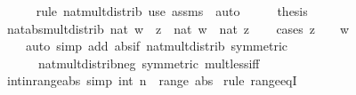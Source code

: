 \begin{isabellebody}
\ \ \ \ \isamarkupfalse%
\ {\isacharparenleft}{\kern0pt}rule\ nat{\isacharunderscore}{\kern0pt}mult{\isacharunderscore}{\kern0pt}distrib{\isacharparenright}{\kern0pt}\ {\isacharparenleft}{\kern0pt}use\ assms\ \ auto{\isacharparenright}{\kern0pt}\isanewline
\ \ \isamarkupfalse%
\ \isamarkupfalse%
\ {\isacharquery}{\kern0pt}thesis\ \isacommand{{\isachardot}{\kern0pt}}\isamarkupfalse%
\isanewline
{}\isamarkupfalse%
%
\endisatagproof
{\isafoldproof}%
%
\isadelimproof
\isanewline
%
\endisadelimproof
\isanewline
{}\isamarkupfalse%
\ nat{\isacharunderscore}{\kern0pt}abs{\isacharunderscore}{\kern0pt}mult{\isacharunderscore}{\kern0pt}distrib{\isacharcolon}{\kern0pt}\ {\isachardoublequoteopen}nat\ {\isasymbar}w\ {\isacharasterisk}{\kern0pt}\ z{\isasymbar}\ {\isacharequal}{\kern0pt}\ nat\ {\isasymbar}w{\isasymbar}\ {\isacharasterisk}{\kern0pt}\ nat\ {\isasymbar}z{\isasymbar}{\isachardoublequoteclose}\isanewline
%
\isadelimproof
\ \ %
\endisadelimproof
%
\isatagproof
{}\isamarkupfalse%
\ {\isacharparenleft}{\kern0pt}cases\ {\isachardoublequoteopen}z\ {\isacharequal}{\kern0pt}\ {}\ {\isasymor}\ w\ {\isacharequal}{\kern0pt}\ {}{\isachardoublequoteclose}{\isacharparenright}{\kern0pt}\isanewline
\ \ \ \ {\isacharparenleft}{\kern0pt}auto\ simp\ add{\isacharcolon}{\kern0pt}\ abs{\isacharunderscore}{\kern0pt}if\ nat{\isacharunderscore}{\kern0pt}mult{\isacharunderscore}{\kern0pt}distrib\ {\isacharbrackleft}{\kern0pt}symmetric{\isacharbrackright}{\kern0pt}\isanewline
\ \ \ \ \ \ nat{\isacharunderscore}{\kern0pt}mult{\isacharunderscore}{\kern0pt}distrib{\isacharunderscore}{\kern0pt}neg\ {\isacharbrackleft}{\kern0pt}symmetric{\isacharbrackright}{\kern0pt}\ mult{\isacharunderscore}{\kern0pt}less{\isacharunderscore}{\kern0pt}{}{\isacharunderscore}{\kern0pt}iff{\isacharparenright}{\kern0pt}%
\endisatagproof
{\isafoldproof}%
%
\isadelimproof
\isanewline
%
\endisadelimproof
\isanewline
{}\isamarkupfalse%
\ int{\isacharunderscore}{\kern0pt}in{\isacharunderscore}{\kern0pt}range{\isacharunderscore}{\kern0pt}abs\ {\isacharbrackleft}{\kern0pt}simp{\isacharbrackright}{\kern0pt}{\isacharcolon}{\kern0pt}\ {\isachardoublequoteopen}int\ n\ {\isasymin}\ range\ abs{\isachardoublequoteclose}\isanewline
%
\isadelimproof
%
\endisadelimproof
%
\isatagproof
{}\isamarkupfalse%
\ {\isacharparenleft}{\kern0pt}rule\ range{\isacharunderscore}{\kern0pt}eqI{\isacharparenright}{\kern0pt}\isanewline
\ \ \isamarkupfalse%

\end{isabellebody}
